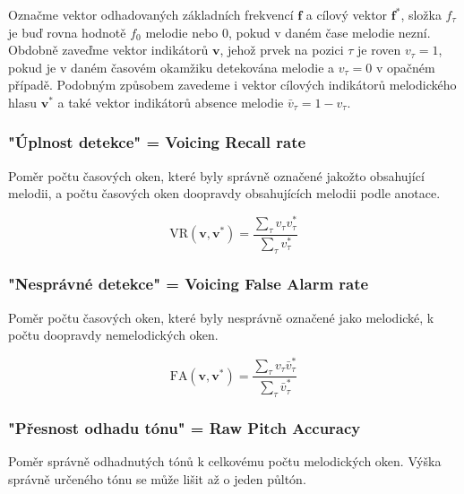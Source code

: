     Označme vektor odhadovaných základních frekvencí $\mathbf{f}$ a cílový vektor $\mathbf{f^*}$, složka $f_\tau$ je buď rovna hodnotě $f_0$ melodie nebo $0$, pokud v daném čase melodie nezní. Obdobně zaveďme vektor indikátorů $\mathbf{v}$, jehož prvek na pozici $\tau$ je roven $v_\tau=1$, pokud je v daném časovém okamžiku detekována melodie a $v_\tau = 0$ v opačném případě. Podobným způsobem zavedeme i vektor cílových indikátorů melodického hlasu $\mathbf{v^*}$ a také vektor indikátorů absence melodie $\bar{v}_\tau = 1 - v_\tau$. 

\subsubsection{"Úplnost detekce" = Voicing Recall rate}

Poměr počtu časových oken, které byly správně označené jakožto obsahující melodii, a počtu časových oken doopravdy obsahujících melodii podle anotace.

    $$\mathrm{VR}(\mathbf{v}, \mathbf{v^*}) = \frac{\sum_\tau{v_\tau v^*_\tau}}{\sum_\tau{v^*_\tau}}$$



\subsubsection{"Nesprávné detekce" = Voicing False Alarm rate}

Poměr počtu časových oken, které byly nesprávně označené jako melodické, k počtu doopravdy nemelodických oken.

    $$\mathrm{FA}(\mathbf{v}, \mathbf{v^*}) = \frac{\sum_\tau{v_\tau \bar{v}^*_\tau}}{\sum_\tau{\bar{v}^*_\tau}}$$



\subsubsection{"Přesnost odhadu tónu" = Raw Pitch Accuracy}

Poměr správně odhadnutých tónů k celkovému počtu melodických oken. Výška správně určeného tónu se může lišit až o jeden půltón.


